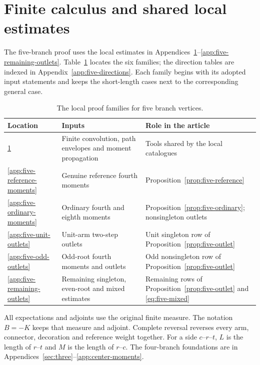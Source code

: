 \section{Finite calculus and shared local estimates}\label{app:five-local-proofs}
The five-branch proof uses the local estimates in
Appendices~\ref{app:five-local-proofs}--\ref{app:five-remaining-outlets}.
Table~\ref{tab:five-proof-families} locates the six families; the
direction tables are indexed in Appendix~\ref{app:five-directions}.
Each family begins with its adopted input statements and keeps the
short-length cases next to the corresponding general case.

\begin{table}[htbp]\centering\small
\caption{The local proof families for five branch vertices.}
\label{tab:five-proof-families}
\begin{tabular}{@{}p{26mm}p{54mm}p{67mm}@{}}\toprule
Location & Inputs & Role in the article\\\midrule
\ref{app:five-local-proofs} & Finite convolution, path envelopes and moment propagation & Tools shared by the local catalogues\\
\ref{app:five-reference-moments} & Genuine reference fourth moments & Proposition~\ref{prop:five-reference}\\
\ref{app:five-ordinary-moments} & Ordinary fourth and eighth moments & Proposition~\ref{prop:five-ordinary}; nonsingleton outlets\\
\ref{app:five-unit-outlets} & Unit-arm two-step outlets & Unit singleton row of Proposition~\ref{prop:five-outlet}\\
\ref{app:five-odd-outlets} & Odd-root fourth moments and outlets & Odd nonsingleton row of Proposition~\ref{prop:five-outlet}\\
\ref{app:five-remaining-outlets} & Remaining singleton, even-root and mixed estimates & Remaining rows of Proposition~\ref{prop:five-outlet} and \eqref{eq:five-mixed}\\\bottomrule
\end{tabular}
\end{table}

All expectations and adjoints use the original finite measure. The
notation $B=-K$ keeps that measure and adjoint. Complete reversal
reverses every arm, connector, decoration and reference weight together.
For a side $c$--$r$--$t$, $L$ is the length of $r$--$t$ and $M$ is the
length of $r$--$c$. The four-branch foundations are in
Appendices~\ref{sec:three}--\ref{app:center-moments}.

